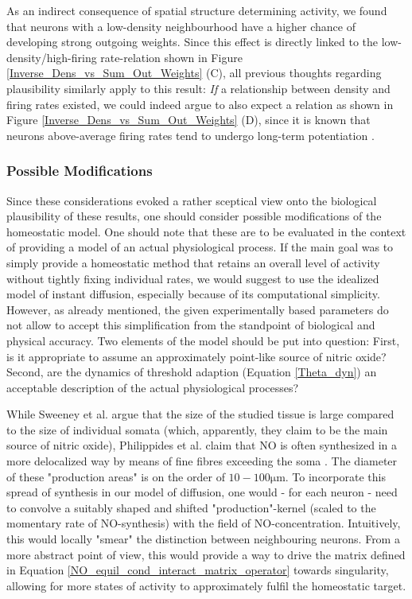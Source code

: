 \documentclass[10pt,a4paper]{article}
\begin{document}
As an indirect consequence of spatial structure determining activity, we found that neurons with a low-density neighbourhood have a higher chance of developing strong outgoing weights. Since this effect is directly linked to the low-density/high-firing rate-relation shown in Figure \ref{Inverse_Dens_vs_Sum_Out_Weights} (C), all previous thoughts regarding plausibility similarly apply to this result: \emph{If} a relationship between density and firing rates existed, we could indeed argue to also expect a relation as shown in Figure \ref{Inverse_Dens_vs_Sum_Out_Weights} (D), since it is known that neurons above-average firing rates tend to undergo long-term potentiation \cite{Sjoestroem_Syn_Plasticity_2001,Feldman_STDP_2012}.

\subsubsection{Possible Modifications}
Since these considerations evoked a rather sceptical view onto the biological plausibility of these results, one should consider possible modifications of the homeostatic model. One should note that these are to be evaluated in the context of providing a model of an actual physiological process. If the main goal was to simply provide a homeostatic method that retains an overall level of activity without tightly fixing individual rates, we would suggest to use the idealized model of instant diffusion, especially because of its computational simplicity. However, as already mentioned, the given experimentally based parameters do not allow to accept this simplification from the standpoint of biological and physical accuracy. Two elements of the model should be put into question: First, is it appropriate to assume an approximately point-like source of nitric oxide? Second, are the dynamics of threshold adaption (Equation \eqref{Theta_dyn}) an acceptable description of the actual physiological processes?

While Sweeney et al. argue that the size of the studied tissue is large compared to the size of individual somata (which, apparently, they claim to be the main source of nitric oxide), Philippides et al. claim that NO is often synthesized in a more delocalized way by means of fine fibres exceeding the soma \cite{Philippides_2005}. The diameter of these "production areas" is on the order of $\mathrm{10-100 \mu m}$. To incorporate this spread of synthesis in our model of diffusion, one would - for each neuron - need to convolve a suitably shaped and shifted "production"-kernel (scaled to the momentary rate of NO-synthesis) with the field of NO-concentration. Intuitively, this would locally "smear" the distinction between neighbouring neurons. From a more abstract point of view, this would provide a way to drive the matrix defined in Equation \eqref{NO_equil_cond_interact_matrix_operator} towards singularity, allowing for more states of activity to approximately fulfil the homeostatic target.
\end{document}
